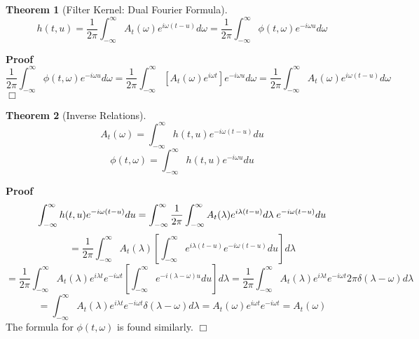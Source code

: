 \documentclass{article}
\newenvironment{proof}{\noindent\textbf{Proof\ }}{\hspace*{\fill}$\Box$\medskip}
\newtheorem{theorem}{Theorem}
\begin{document}
\begin{theorem}[Filter Kernel: Dual Fourier Formula]
  \[ h (t, u) = \frac{1}{2 \pi}  \int_{- \infty}^{\infty} A_t (\omega) e^{i
     \omega (t - u)} d \omega = \frac{1}{2 \pi}  \int_{- \infty}^{\infty} \phi
     (t, \omega) e^{- i \omega u} d \omega \]
\end{theorem}

\begin{proof}
  \[ \frac{1}{2 \pi}  \int_{- \infty}^{\infty} \phi (t, \omega) e^{- i \omega
     u} d \omega = \frac{1}{2 \pi}  \int_{- \infty}^{\infty} [A_t (\omega)
     e^{i \omega t}] e^{- i \omega u} d \omega = \frac{1}{2 \pi}  \int_{-
     \infty}^{\infty} A_t (\omega) e^{i \omega (t - u)} d \omega \]
\end{proof}

\begin{theorem}[Inverse Relations]
  \begin{equation}
    A_t (\omega) = \int_{- \infty}^{\infty} h (t, u) e^{- i \omega (t - u)} du
  \end{equation}
  \begin{equation}
    \phi (t, \omega) = \int_{- \infty}^{\infty} h (t, u) e^{- i \omega u} du
  \end{equation}
\end{theorem}

\begin{proof}
  \[ \int_{- \infty}^{\infty} h (t, u) e^{- i \omega (t - u)} du = \int_{-
     \infty}^{\infty} \frac{1}{2 \pi}  \int_{- \infty}^{\infty} A_t (\lambda)
     e^{i \lambda (t - u)} d \lambda \hspace{0.27em} e^{- i \omega (t - u)} du
  \]
  \[ = \frac{1}{2 \pi}  \int_{- \infty}^{\infty} A_t (\lambda) \left[ \int_{-
     \infty}^{\infty} e^{i \lambda (t - u)} e^{- i \omega (t - u)} du \right]
     d \lambda \]
  \[ = \frac{1}{2 \pi}  \int_{- \infty}^{\infty} A_t (\lambda) e^{i \lambda t}
     e^{- i \omega t} \left[ \int_{- \infty}^{\infty} e^{- i (\lambda -
     \omega) u} du \right] d \lambda = \frac{1}{2 \pi}  \int_{-
     \infty}^{\infty} A_t (\lambda) e^{i \lambda t} e^{- i \omega t} 2 \pi
     \delta (\lambda - \omega) d \lambda \]
  \[ = \int_{- \infty}^{\infty} A_t (\lambda) e^{i \lambda t} e^{- i \omega t}
     \delta (\lambda - \omega) d \lambda = A_t (\omega) e^{i \omega t} e^{- i
     \omega t} = A_t (\omega) \]
  The formula for $\phi (t, \omega)$ is found similarly.
\end{proof}

\
\end{document}

